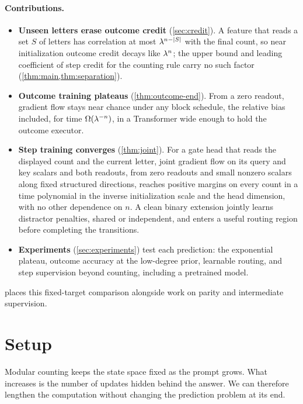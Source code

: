 \paragraph{Contributions.}
\begin{itemize}[leftmargin=*,itemsep=2pt,topsep=3pt]
\item \textbf{Unseen letters erase outcome credit} (\cref{sec:credit}). A feature that reads a set $S$ of letters has correlation at most
$\lambda^{n-|S|}$ with the final count, so near initialization outcome credit decays like $\lambda^n$; the upper bound and leading coefficient of
step credit for the counting rule carry no such factor (\cref{thm:main,thm:separation}).
\item \textbf{Outcome training plateaus} (\cref{thm:outcome-end}). From a zero readout, gradient flow stays near chance under any block schedule, the relative bias included,
for time $\Omega(\lambda^{-n})$, in a Transformer wide enough to hold the outcome executor.
\item \textbf{Step training converges} (\cref{thm:joint}). For a gate head that reads the displayed count and the current
letter, joint gradient flow on its query and key scalars and both readouts, from zero readouts and small nonzero scalars along fixed structured directions,
reaches positive margins on every count in a time polynomial in the inverse initialization scale and the head dimension, with no other dependence on $n$.
A clean binary extension jointly learns distractor penalties, shared or independent, and enters a useful routing region before completing the transitions.
\item \textbf{Experiments} (\cref{sec:experiments}) test each prediction: the exponential plateau, outcome accuracy at the
low-degree prior, learnable routing, and step supervision beyond counting, including a pretrained model.
\end{itemize}

 places this fixed-target comparison alongside work on parity and intermediate supervision.

\section{Setup}
\label{sec:setup}
\label{sec:setting}

Modular counting keeps the state space fixed as the prompt grows. What increases is the number of updates hidden behind the
answer. We can therefore lengthen the computation without changing the prediction problem at its end.


